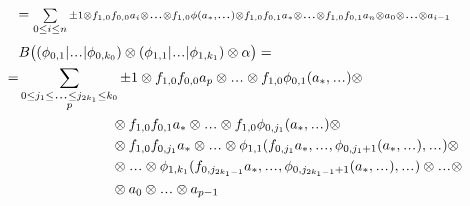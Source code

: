 \documentclass[t]{beamer}
\theoremstyle{plain}
\theoremstyle{example}
\theoremstyle{definition}
\newcommand \smdots{\makebox[1em][c]{.\hfil.\hfil.}}
\let \dots \smdots
\begin{document}
{{$$	= {\scriptstyle 
	\sum \limits_{\substack{0\leq i \leq n\\*}} \pm
	1 \otimes f_{1,0}f_{0,0}a_i \otimes 
	\dots \otimes f_{1,0}\phi(a_*, \dots) \otimes
	f_{1,0}f_{0,1}a_* \otimes
	\dots \otimes f_{1,0}f_{0,1}a_n \otimes 
	a_0 \otimes \dots \otimes a_{i-1}}$$}
	\only<7>
	{\begin{align*}
	&B \big(
	(\phi_{0,1}|\dots|\phi_{0,k_0}) \otimes 
	(\phi_{1,1}|\dots|\phi_{1,k_1}) \otimes 
	\alpha \big) = \\
	=  &\sum_{\substack{
	   0 \leq j_1 \leq \dots \leq j_{2k_1} \leq k_0 
	   \\p}}
	\pm 1 \otimes  		
	  f_{1,0}f_{0,0}a_p \otimes \dots \otimes 
	  f_{1,0}\phi_{0,1}(a_*, \dots) \otimes \\
	&\phantom{moveovermove}  \otimes
	  f_{1,0}f_{0,1}a_* \otimes \dots \otimes
	  f_{1,0}\phi_{0,j_1}(a_*, \dots) \otimes \\
	&\phantom{moveovermove}  \otimes
	  f_{1,0}f_{0,j_1}a_* \otimes \dots \otimes
	  \phi_{1,1}(f_{0,j_1}a_*, \dots, 
	  \phi_{0,j_1+1}(a_*, \dots), \dots) \otimes \\
	&\phantom{moveovermove} \otimes	  
	  \dots \otimes \phi_{1,k_1}(f_{0,j_{2k_1-1}}a_*, \dots, 
	  \phi_{0,j_{2k_1-1}+1}(a_*, \dots), \dots) \otimes 
	  \dots \otimes \\
	&\phantom{moveovermove} \otimes	
	  a_0 \otimes \dots \otimes a_{p-1}
	  \end{align*}}
}

\end{document}
